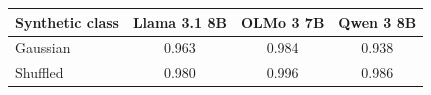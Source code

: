\begin{tabular}{lS[table-format=1.3, round-mode=places, round-precision=3]S[table-format=1.3, round-mode=places, round-precision=3]S[table-format=1.3, round-mode=places, round-precision=3]}
\toprule
Synthetic class & {Llama 3.1 8B} & {OLMo 3 7B} & {Qwen 3 8B} \\
\midrule
Gaussian & 0.963 & 0.984 & 0.938 \\
Shuffled & 0.980 & 0.996 & 0.986 \\
\bottomrule
\end{tabular}
